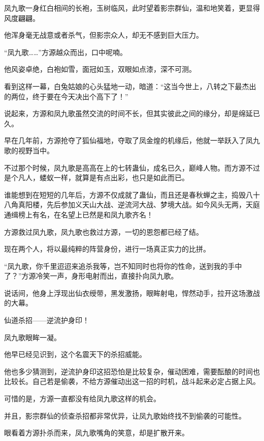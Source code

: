 
\begin{this_body}

凤九歌一身红白相间的长袍，玉树临风，此时望着影宗群仙，温和地笑着，更显得风度翩翩。

他浑身毫无战意或者杀气，但影宗众人，却无不感到巨大压力。

“凤九歌……”方源越众而出，口中呢喃。

他风姿卓绝，白袍如雪，面冠如玉，双眼如点漆，深不可测。

看到这样一幕，白兔姑娘的心头猛地一动，暗道：“这当今世上，八转之下最杰出的两位，终于要在今天决出个高下了！”

说起来，方源和凤九歌虽然交流的时间不长，但其实彼此之间的缘分，却是绵延已久。

早在几年前，方源抢夺了狐仙福地，夺取了凤金煌的机缘后，他就一举跃入了凤九歌的视野当中。

不过那个时候，凤九歌是高高在上的七转蛊仙，成名已久，巅峰人物。而方源不过是个凡人，蝼蚁一样，就算是有点出彩，也只是如此而已。

谁能想到在短短的几年后，方源不仅成就了蛊仙，而且还是春秋蝉之主，捣毁八十八角真阳楼，先后参加义天山大战、逆流河大战、梦境大战。如今风头无两，天庭通缉榜上有名，在名望上已然是和凤九歌齐名！

方源救过凤九歌，凤九歌也救过方源，一切的恩怨都已经了结。

现在两个人，将以最纯粹的阵营身份，进行一场真正实力的比拼。

“凤九歌，你千里迢迢来追杀我等，岂不知同时也将你的性命，送到我的手中了？”方源冷笑一声，身形电射而出，直接扑向凤九歌。

说话间，他身上浮现出仙衣绶带，黑发激扬，眼眸射电，悍然动手，拉开这场激战的大幕。

仙道杀招——逆流护身印！

凤九歌眼眸一凝。

他早已经见识到，这个名震天下的杀招威能。

他也多少猜测到，逆流护身印这招恐怕是比较复杂，催动困难，需要酝酿的时间也比较长。自己若是偷袭，不给方源催动出这一招的时机，战斗起来必定占据上风。

可惜的是，方源一直都没有给凤九歌这样的机会。

并且，影宗群仙的侦查杀招都非常优异，让凤九歌始终找不到偷袭的可能性。

眼看着方源扑杀而来，凤九歌嘴角的笑意，却是扩散开来。


\end{this_body}
